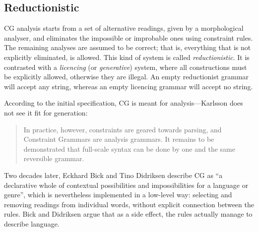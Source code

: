 \subsection{Reductionistic}\label{reductionist-vs.licencing}

CG analysis starts from a set of alternative readings, given by a morphological analyser,
and eliminates the impossible or improbable ones using constraint rules. 
The remaining analyses are assumed to be correct; that
is, everything that is not explicitly eliminated, is allowed. 
This kind of system is called \emph{reductionistic}. It is contrasted 
with a \emph{licencing} (or \emph{generative}) system, where all constructions must
be explicitly allowed, otherwise they are illegal. 
An empty reductionist grammar will accept any string, whereas an empty
licencing grammar will accept no string.




According to the initial specification, CG is meant for analysis---Karlsson \cite{karlsson1995constraint} does not see it fit for generation:

\begin{quote}
In practice, however, constraints are geared towards parsing, and Constraint Grammars are analysis grammars. It remains to be demonstrated that full-scale syntax can be done by one and the same reversible grammar.
\end{quote}
\noindent Two decades later, Eckhard Bick and Tino Didriksen \cite{bick2015} 
describe CG as ``a declarative whole of contextual possibilities and impossibilities 
for a language or genre'', which is nevertheless implemented in a
low-level way: selecting and removing readings from individual words,
without explicit connection between the rules. Bick and Didriksen
argue that as a side effect, the rules actually manage to describe language.

